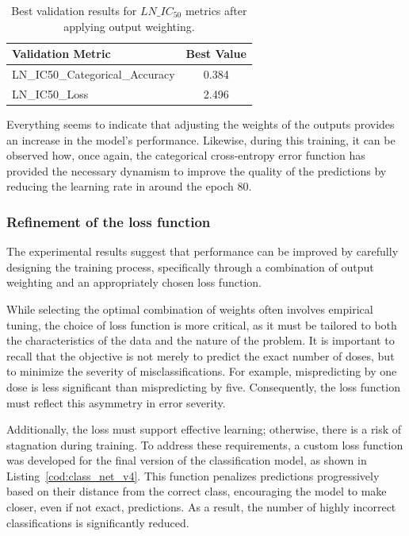 \begin{table}[H]
    \centering
    \begin{tabular}{|l|c|}
    \hline
    \textbf{Validation Metric} & \textbf{Best Value} \\
    \hline
    LN\_IC50\_Categorical\_Accuracy & 0.384 \\
    LN\_IC50\_Loss & 2.496 \\
    \hline
    \end{tabular}
    \caption{Best validation results for \(LN\_IC_{50}\) metrics after applying output weighting.}
    \label{tab:best_val_ln_ic50_wheighting}
\end{table}

Everything seems to indicate that adjusting the weights of the outputs provides an increase in the model's performance. Likewise, during this training, it can be observed how, once again, the categorical cross-entropy error function has provided the necessary dynamism to improve the quality of the predictions by reducing the learning rate in around the epoch 80.

\subsubsection{Refinement of the loss function}

The experimental results suggest that performance can be improved by carefully designing the training process, specifically through a combination of output weighting and an appropriately chosen loss function.

While selecting the optimal combination of weights often involves empirical tuning, the choice of loss function is more critical, as it must be tailored to both the characteristics of the data and the nature of the problem. It is important to recall that the objective is not merely to predict the exact number of doses, but to minimize the severity of misclassifications. For example, mispredicting by one dose is less significant than mispredicting by five. Consequently, the loss function must reflect this asymmetry in error severity.

Additionally, the loss must support effective learning; otherwise, there is a risk of stagnation during training. To address these requirements, a custom loss function was developed for the final version of the classification model, as shown in Listing~\ref{cod:class_net_v4}. This function penalizes predictions progressively based on their distance from the correct class, encouraging the model to make closer, even if not exact, predictions. As a result, the number of highly incorrect classifications is significantly reduced.

